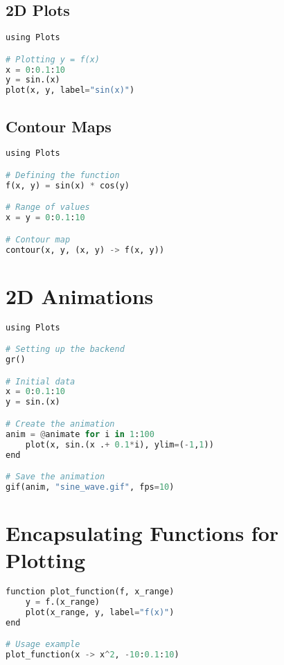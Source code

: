 \documentclass[a4paper,12pt]{article}
\begin{document}
\subsection{2D Plots}

\begin{lstlisting}[language=Python]
using Plots

# Plotting y = f(x)
x = 0:0.1:10
y = sin.(x)
plot(x, y, label="sin(x)")
\end{lstlisting}

\subsection{Contour Maps}

\begin{lstlisting}[language=Python]
using Plots

# Defining the function
f(x, y) = sin(x) * cos(y)

# Range of values
x = y = 0:0.1:10

# Contour map
contour(x, y, (x, y) -> f(x, y))
\end{lstlisting}

\section{2D Animations}

\begin{lstlisting}[language=Python]
using Plots

# Setting up the backend
gr()

# Initial data
x = 0:0.1:10
y = sin.(x)

# Create the animation
anim = @animate for i in 1:100
    plot(x, sin.(x .+ 0.1*i), ylim=(-1,1))
end

# Save the animation
gif(anim, "sine_wave.gif", fps=10)
\end{lstlisting}

\section{Encapsulating Functions for Plotting}

\begin{lstlisting}[language=Python]
function plot_function(f, x_range)
    y = f.(x_range)
    plot(x_range, y, label="f(x)")
end

# Usage example
plot_function(x -> x^2, -10:0.1:10)
\end{lstlisting}
\end{document}
